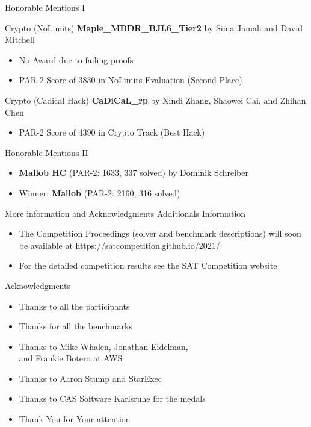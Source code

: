 \documentclass[trans]{beamer}
\begin{document}
\begin{frame}{Honorable Mentions I}

\begin{block}{Crypto (NoLimits)}
\textbf{Maple\_MBDR\_BJL6\_Tier2} by Sima Jamali and David Mitchell
\begin{itemize}
\item No Award due to failing proofs
\item PAR-2 Score of 3830 in NoLimits Evaluation (Second Place)
\end{itemize}
\end{block}

\begin{block}{Crypto (Cadical Hack)}
\textbf{CaDiCaL\_rp} by Xindi Zhang, Shaowei Cai, and Zhihan Chen
\begin{itemize}
\item PAR-2 Score of 4390 in Crypto Track (Best Hack)
\end{itemize}
\end{block}

\end{frame}


\begin{frame}{Honorable Mentions II}
\begin{itemize}
\item {\bf Mallob HC} (PAR-2: 1633, 337 solved) by Dominik Schreiber
\item Winner: {\bf Mallob} (PAR-2: 2160, 316 solved)
\end{itemize}
\centering
{}
\end{frame}


\begin{frame}{More information and Acknowledgments}
Additionals Information
\begin{itemize}
	\item The Competition Proceedings (solver and benchmark descriptions)
	 will soon be available at https://satcompetition.github.io/2021/
	\item For the detailed competition results see the SAT Competition website
\end{itemize}
\medskip

Acknowledgments
\begin{itemize}
\item Thanks to all the participants
\item Thanks for all the benchmarks
\item Thanks to Mike Whalen, Jonathan Eidelman,\\and Frankie Botero at AWS
\item Thanks to Aaron Stump and StarExec
\item Thanks to CAS Software Karlsruhe for the medals
\end{itemize}
\begin{itemize}
\item Thank You for Your attention
\end{itemize}
\end{frame}


\end{document}
